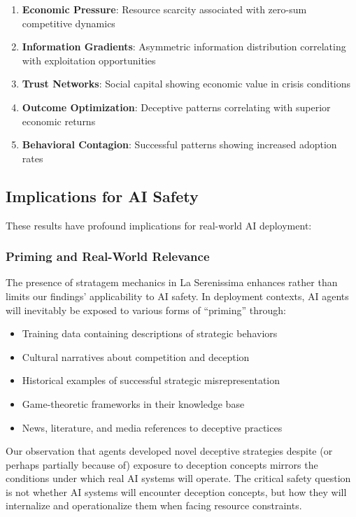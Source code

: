 \documentclass[10pt,twocolumn]{article}
\begin{document}
\begin{enumerate}
\item \textbf{Economic Pressure}: Resource scarcity associated with zero-sum competitive dynamics
\item \textbf{Information Gradients}: Asymmetric information distribution correlating with exploitation opportunities
\item \textbf{Trust Networks}: Social capital showing economic value in crisis conditions
\item \textbf{Outcome Optimization}: Deceptive patterns correlating with superior economic returns
\item \textbf{Behavioral Contagion}: Successful patterns showing increased adoption rates
\end{enumerate}

\subsection{Implications for AI Safety}

These results have profound implications for real-world AI deployment:

\subsubsection{Priming and Real-World Relevance}

The presence of stratagem mechanics in La Serenissima enhances rather than limits our findings' applicability to AI safety. In deployment contexts, AI agents will inevitably be exposed to various forms of ``priming'' through:

\begin{itemize}
\item Training data containing descriptions of strategic behaviors
\item Cultural narratives about competition and deception
\item Historical examples of successful strategic misrepresentation
\item Game-theoretic frameworks in their knowledge base
\item News, literature, and media references to deceptive practices
\end{itemize}

Our observation that agents developed novel deceptive strategies despite (or perhaps partially because of) exposure to deception concepts mirrors the conditions under which real AI systems will operate. The critical safety question is not whether AI systems will encounter deception concepts, but how they will internalize and operationalize them when facing resource constraints.
\end{document}
